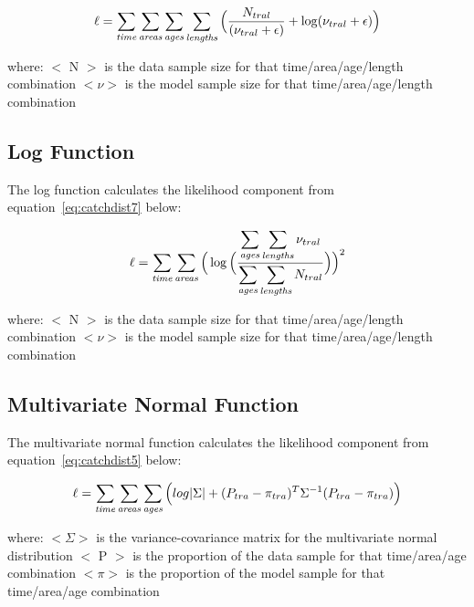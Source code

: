 \documentclass[10pt,twoside]{book}
\begin{document}
\begin{equation}\label{eq:catchdist3}
\ell = \sum_{\it time}\sum_{\it areas}\sum_{\it ages}\sum_{\it lengths} \Big( {\frac{ N_{tral}} { (\nu_{tral} + \epsilon )} + \log ({\nu_{tral} + \epsilon}}) \Big)
\end{equation}

where:\newline
$<$ N $>$ is the data sample size for that time/area/age/length combination\newline
$<\nu>$ is the model sample size for that time/area/age/length combination

\subsection{Log Function}
The log function calculates the likelihood component from equation~\ref{eq:catchdist7} below:

\begin{equation}\label{eq:catchdist7}
\ell = \sum_{\it time}\sum_{\it areas} \Big( \log \Big( {\frac{ \displaystyle \sum_{\it ages}\sum_{\it lengths} \nu_{tral}} { \displaystyle \sum_{\it ages}\sum_{\it lengths} N_{tral}}} \Big) \Big) ^2
\end{equation}

where:\newline
$<$ N $>$ is the data sample size for that time/area/age/length combination\newline
$<\nu>$ is the model sample size for that time/area/age/length combination

\subsection{Multivariate Normal Function}
The multivariate normal function calculates the likelihood component from equation~\ref{eq:catchdist5} below:

\begin{equation}\label{eq:catchdist5}
\ell = \sum_{\it time}\sum_{\it areas}\sum_{\it ages} \Big( log|\Sigma| + (P_{tra} - \pi_{tra})^T \Sigma^{-1}(P_{tra} - \pi_{tra}) \Big)
\end{equation}

where:\newline
$<\Sigma>$ is the variance-covariance matrix for the multivariate normal distribution\newline
$<$ P $>$ is the proportion of the data sample for that time/area/age combination\newline
$<\pi>$ is the proportion of the model sample for that time/area/age combination
\end{document}
